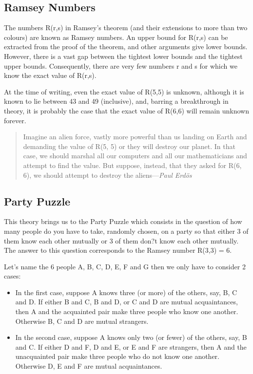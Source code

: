 	\subsection{Ramsey Numbers}
	
		The numbers R(r,s) in Ramsey's theorem (and their extensions to more
		than two colours) are known as Ramsey numbers. An upper bound for R(r,s)
		can be extracted from the proof of the theorem, and other arguments give
		lower bounds. However, there is a vast gap between the tightest lower
		bounds and the tightest upper bounds. Consequently, there are very few
		numbers r and s for which we know the exact value of R(r,s).
		
		At the time of writing, even the exact value of R(5,5) is unknown,
		although it is known to lie between 43 and 49 (inclusive), and, barring
		a breakthrough in theory, it is probably the case that the exact value
		of R(6,6) will remain unknown forever.
	
		\begin{quotation}	
		
			Imagine an alien force, vastly more powerful than us landing on
			Earth and demanding the value of R(5, 5) or they will destroy our
			planet. In that case, we should marshal all our computers and all
			our mathematicians and attempt to find the value. But suppose,
			instead, that they asked for R(6, 6), we should attempt to destroy
			the aliens---\emph{Paul Erd\"os}
		
		\end{quotation}
		
	\subsection{Party Puzzle}
	
		This theory brings us to the Party Puzzle which consists in the question
		of how many people do you have to take, randomly chosen, on a party so
		that either 3 of them know each other mutually or 3 of them don?t know
		each other mutually. The answer to this question corresponds to the
		Ramsey number R(3,3) = 6.

		Let's name the 6 people A, B, C, D, E, F and G then we only have to
		consider 2 cases:
		
		\begin{itemize}
			
			\item In the first case, suppose A knows three (or more) of the
			others, say, B, C and D. If either B and C, B and D, or C and D are
			mutual acquaintances, then A and the acquainted pair make three
			people who know one another. Otherwise B, C and D are mutual
			strangers.
			
			\item In the second case, suppose A knows only two (or fewer) of the
			others, say, B and C. If either D and F, D and E, or E and F are
			strangers, then A and the unacquainted pair make three people who do
			not know one another. Otherwise D, E and F are mutual acquaintances.
			
		\end{itemize}
		
